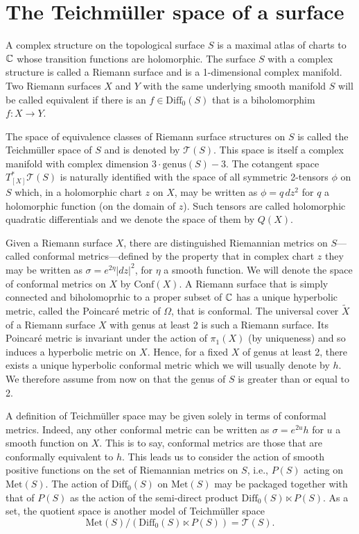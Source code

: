 \section{The Teichm\"uller space of a surface}


A complex structure on the topological surface $S$ is a maximal atlas of charts to $\mathbb{C}$ whose transition functions are holomorphic. 
The surface $S$ with a complex structure is called a Riemann surface and is a 1-dimensional complex manifold. 
Two Riemann surfaces $X$ and $Y$ with the same underlying smooth manifold $S$ will be called equivalent if there is an $f \in \mathrm{Diff}_0(S)$ that is a biholomorphim $f: X \to Y$. 

The space of equivalence classes of Riemann surface structures on $S$ is called the Teichm\"uller space of $S$ and is denoted by $\mathcal{T}(S)$. 
This space is itself a complex manifold with complex dimension $3\cdot \text{genus}(S) - 3$. 
The cotangent space $T^*_{[X]}\mathcal{T}(S)$ is naturally identified with the space of all symmetric 2-tensors $\phi$ on $S$ which, in a holomorphic chart $z$ on $X$, may be written as $\phi = q \, dz^2$ for $q$ a holomorphic function (on the domain of $z$). 
Such tensors are called holomorphic quadratic differentials and we denote the space of them by $Q(X)$. 

Given a Riemann surface $X$, there are distinguished Riemannian metrics on $S$---called conformal metrics---defined by the property that in complex chart $z$  they may be written as $\sigma = e^{2\eta} |dz|^2$, for $\eta$ a smooth function. 
We will denote the space of conformal metrics on $X$ by $\mathrm{Conf}(X)$. 
A Riemann surface that is simply connected and biholomoprhic to a proper subset of $\mathbb{C}$ has a unique hyperbolic metric, called the Poincar\'e metric of $\Omega$, that is conformal. 
The universal cover $\tilde{X}$ of a Riemann surface $X$ with genus at least 2 is such a Riemann surface. 
Its Poincar\'e metric is invariant under the action of $\pi_1(X)$ (by uniqueness) and so induces a hyperbolic metric on $X$. Hence, for a fixed $X$ of genus at least 2, there exists a unique hyperbolic conformal metric which we will usually denote by $h$. 
We therefore assume from now on that the genus of $S$ is greater than or equal to 2. 

A definition of Teichm\"uller space may be given solely in terms of conformal metrics. 
Indeed, any other conformal metric can be written as $\sigma = e^{2u}h$ for $u$ a smooth function on $X$. 
This is to say, conformal metrics are those that are conformally equivalent to $h$. 
This leads us to consider the action of smooth positive functions on the set of Riemannian metrics on $S$, i.e., $P(S)$ acting on $\mathrm{Met}(S)$. 
The action of $\mathrm{Diff}_0(S)$ on $\mathrm{Met}(S)$ may be packaged together with that of $P(S)$ as the action of the semi-direct product $\mathrm{Diff}_0(S) \ltimes P(S)$. 
As a set, the quotient space is another model of Teichm\"uller space
\[
\mathrm{Met}(S)/(\mathrm{Diff}_0(S) \ltimes P(S)) = \mathcal{T}(S).
\]

